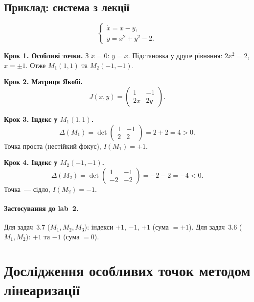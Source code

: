 \documentclass[12pt,a4paper]{article}
\begin{document}
\subsection{Приклад: система з лекції}

\begin{equation}\label{eq:lecture-example}
\begin{cases}
  \dot{x} = x - y,\\
  \dot{y} = x^2 + y^2 - 2.
\end{cases}
\end{equation}

\textbf{Крок 1. Особливі точки.}
З $\dot{x}=0$: $y=x$. Підстановка у друге рівняння: $2x^2=2$, $x=\pm1$.
Отже $M_1(1,1)$ та $M_2(-1,-1)$.

\textbf{Крок 2. Матриця Якобі.}
\begin{equation*}
  J(x,y)=
  \begin{pmatrix}
    1 & -1\\
    2x & 2y
  \end{pmatrix}.
\end{equation*}

\textbf{Крок 3. Індекс у $M_1(1,1)$.}
\begin{equation*}
  \Delta(M_1)=\det\begin{pmatrix}1&-1\\2&2\end{pmatrix}
  =2+2=4>0.
\end{equation*}
Точка проста (нестійкий фокус), \textbf{$I(M_1)=+1$}.

\textbf{Крок 4. Індекс у $M_2(-1,-1)$.}
\begin{equation*}
  \Delta(M_2)=\det\begin{pmatrix}1&-1\\-2&-2\end{pmatrix}
  =-2-2=-4<0.
\end{equation*}
Точка~--- сідло, \textbf{$I(M_2)=-1$}.

\paragraph{Застосування до lab~2.}
Для задач~3.7 ($M_1,M_2,M_3$): індекси $+1$, $-1$, $+1$ (сума $=+1$).
Для задач~3.6 ($M_1,M_2$): $+1$ та $-1$ (сума $=0$).

\section{Дослідження особливих точок методом лінеаризації}
\end{document}
